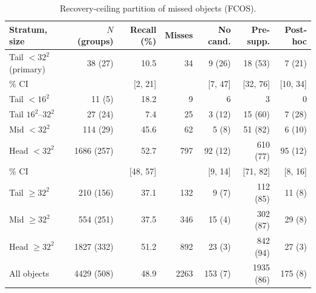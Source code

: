\begin{table}[!htbp]
\footnotesize
\caption{Recovery-ceiling partition of missed objects (FCOS).}
\label{tab:partition-fcos}
\begin{tabular}{lrrrrrr}
\toprule
Stratum, size & $N$ (groups) & Recall (\%) & Misses & No cand. & Pre-supp. & Post-hoc \\
\midrule
Tail $<32^2$ (primary) & 38 (27) & 10.5 & 34 & 9 (26) & 18 (53) & 7 (21) \\
\quad 95\% CI & & [2, 21] & & [7, 47] & [32, 76] & [10, 34] \\
\quad Tail $<16^2$ & 11 (5) & 18.2 & 9 & 6 & 3 & 0 \\
\quad Tail $16^2$--$32^2$ & 27 (24) & 7.4 & 25 & 3 (12) & 15 (60) & 7 (28) \\
Mid $<32^2$ & 114 (29) & 45.6 & 62 & 5 (8) & 51 (82) & 6 (10) \\
Head $<32^2$ & 1686 (257) & 52.7 & 797 & 92 (12) & 610 (77) & 95 (12) \\
\quad 95\% CI & & [48, 57] & & [9, 14] & [71, 82] & [8, 16] \\
Tail $\geq 32^2$ & 210 (156) & 37.1 & 132 & 9 (7) & 112 (85) & 11 (8) \\
Mid $\geq 32^2$ & 554 (251) & 37.5 & 346 & 15 (4) & 302 (87) & 29 (8) \\
Head $\geq 32^2$ & 1827 (332) & 51.2 & 892 & 23 (3) & 842 (94) & 27 (3) \\
All objects & 4429 (508) & 48.9 & 2263 & 153 (7) & 1935 (86) & 175 (8) \\
\bottomrule
\end{tabular}
\end{table}
